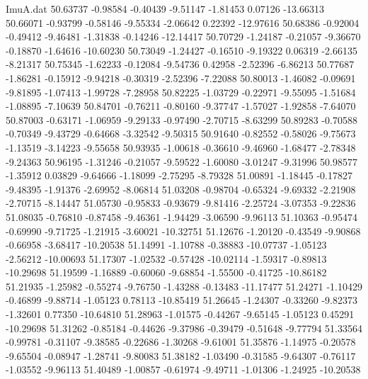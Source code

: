 \begin{filecontents}{ImuA.dat}
  50.63737   -0.98584   -0.40439   -9.51147   -1.81453    0.07126  -13.66313
  50.66071   -0.93799   -0.58146   -9.55334   -2.06642    0.22392  -12.97616
  50.68386   -0.92004   -0.49412   -9.46481   -1.31838   -0.14246  -12.14417
  50.70729   -1.24187   -0.21057   -9.36670   -0.18870   -1.64616  -10.60230
  50.73049   -1.24427   -0.16510   -9.19322    0.06319   -2.66135   -8.21317
  50.75345   -1.62233   -0.12084   -9.54736    0.42958   -2.52396   -6.86213
  50.77687   -1.86281   -0.15912   -9.94218   -0.30319   -2.52396   -7.22088
  50.80013   -1.46082   -0.09691   -9.81895   -1.07413   -1.99728   -7.28958
  50.82225   -1.03729   -0.22971   -9.55095   -1.51684   -1.08895   -7.10639
  50.84701   -0.76211   -0.80160   -9.37747   -1.57027   -1.92858   -7.64070
  50.87003   -0.63171   -1.06959   -9.29133   -0.97490   -2.70715   -8.63299
  50.89283   -0.70588   -0.70349   -9.43729   -0.64668   -3.32542   -9.50315
  50.91640   -0.82552   -0.58026   -9.75673   -1.13519   -3.14223   -9.55658
  50.93935   -1.00618   -0.36610   -9.46960   -1.68477   -2.78348   -9.24363
  50.96195   -1.31246   -0.21057   -9.59522   -1.60080   -3.01247   -9.31996
  50.98577   -1.35912    0.03829   -9.64666   -1.18099   -2.75295   -8.79328
  51.00891   -1.18445   -0.17827   -9.48395   -1.91376   -2.69952   -8.06814
  51.03208   -0.98704   -0.65324   -9.69332   -2.21908   -2.70715   -8.14447
  51.05730   -0.95833   -0.93679   -9.81416   -2.25724   -3.07353   -9.22836
  51.08035   -0.76810   -0.87458   -9.46361   -1.94429   -3.06590   -9.96113
  51.10363   -0.95474   -0.69990   -9.71725   -1.21915   -3.60021  -10.32751
  51.12676   -1.20120   -0.43549   -9.90868   -0.66958   -3.68417  -10.20538
  51.14991   -1.10788   -0.38883  -10.07737   -1.05123   -2.56212  -10.00693
  51.17307   -1.02532   -0.57428  -10.02114   -1.59317   -0.89813  -10.29698
  51.19599   -1.16889   -0.60060   -9.68854   -1.55500   -0.41725  -10.86182
  51.21935   -1.25982   -0.55274   -9.76750   -1.43288   -0.13483  -11.17477
  51.24271   -1.10429   -0.46899   -9.88714   -1.05123    0.78113  -10.85419
  51.26645   -1.24307   -0.33260   -9.82373   -1.32601    0.77350  -10.64810
  51.28963   -1.01575   -0.44267   -9.65145   -1.05123    0.45291  -10.29698
  51.31262   -0.85184   -0.44626   -9.37986   -0.39479   -0.51648   -9.77794
  51.33564   -0.99781   -0.31107   -9.38585   -0.22686   -1.30268   -9.61001
  51.35876   -1.14975   -0.20578   -9.65504   -0.08947   -1.28741   -9.80083
  51.38182   -1.03490   -0.31585   -9.64307   -0.76117   -1.03552   -9.96113
  51.40489   -1.00857   -0.61974   -9.49711   -1.01306   -1.24925  -10.20538

\end{filecontents}
